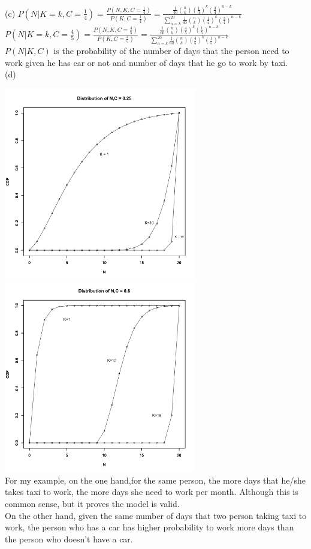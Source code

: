 \documentclass[11pt]{article}
\begin{document}
(c) $P(N|K=k,C = \frac{1}{4})  =\frac{P(N,K,C=\frac{1}{4})}{P(K,C = \frac{1}{4})} = \frac{\frac{1}{30} {n \choose k } (\frac{1}{4})^k (\frac{3}{4})^{n-k}}{\sum_{n = k}^{20}\frac{1}{30} {n \choose k } (\frac{1}{4})^k (\frac{3}{4})^{n-k} }$\\
$P(N|K=k,C = \frac{4}{5})  =\frac{P(N,K,C=\frac{4}{5})}{P(K,C = \frac{4}{5})} = \frac{\frac{1}{60} {n \choose k } (\frac{4}{5})^k (\frac{1}{5})^{n-k}}{\sum_{n = k}^{20}\frac{1}{60} {n \choose k } (\frac{4}{5})^k (\frac{1}{5})^{n-k} }$\\
$P(N|K,C)$ is the probability of the number of days that the person need to work given he has car or not and number of days that he go to work by taxi.\\

(d)

\includegraphics[height = 3.3in]{Q2_d_1} \includegraphics[height = 3.3in]{Q2_d_2}\\
For my example, on the one hand,for the same person, the more days that he/she takes taxi to work, the more days she need to work per month. Although this is common sense, but it proves the model is valid.\\
On the other hand, given the same number of days that two person taking taxi to work, the person who has a car has higher probability to work more days than the person who doesn't have a car.\\
\end{document}
